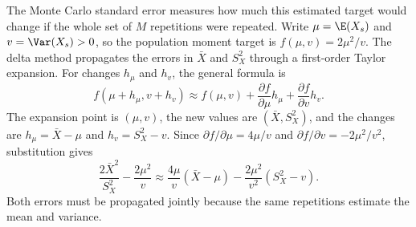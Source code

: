 The Monte Carlo standard error measures how much this estimated target
would change if the whole set of \(M\) repetitions were repeated.
Write \(\mu=\E(X_s)\) and \(v=\Var(X_s)>0\), so the population
moment target is \(f(\mu,v)=2\mu^2/v\). The delta method propagates
the errors in \(\bar X\) and \(S_X^2\) through a first-order Taylor
expansion. For changes \(h_\mu\) and \(h_v\), the general formula is
\begin{equation}
 f(\mu+h_\mu,v+h_v)
 \approx f(\mu,v)
 +\frac{\partial f}{\partial\mu}h_\mu
 +\frac{\partial f}{\partial v}h_v.
\end{equation}
The expansion point is \((\mu,v)\), the new values are
\((\bar X,S_X^2)\), and the changes are
\(h_\mu=\bar X-\mu\) and \(h_v=S_X^2-v\). Since
\(\partial f/\partial\mu=4\mu/v\) and
\(\partial f/\partial v=-2\mu^2/v^2\), substitution gives
\begin{equation}
 \frac{2\bar X^2}{S_X^2}-\frac{2\mu^2}{v}
 \approx\frac{4\mu}{v}(\bar X-\mu)
       -\frac{2\mu^2}{v^2}(S_X^2-v).
 \label{eq:moment-target-taylor}
\end{equation}
Both errors must be propagated jointly because the same repetitions
estimate the mean and variance.

